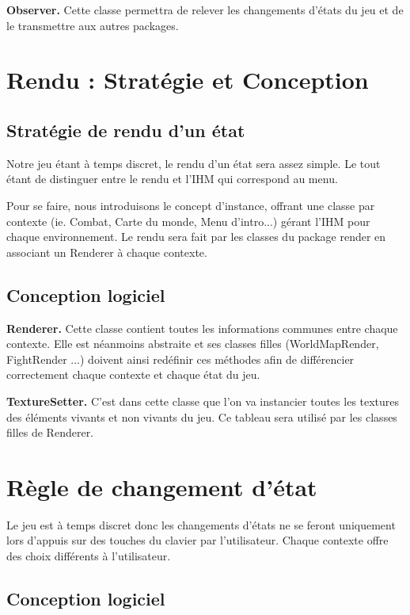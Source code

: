 \documentclass[12pt,a4paper]{report}
\begin{document}
\textbf{Observer.} Cette classe permettra de relever les changements d'\'{e}tats du jeu et de le transmettre aux autres packages.


\chapter{Rendu : Strat\'{e}gie et Conception}
\section{Strat\'{e}gie de rendu d'un \'{e}tat}
Notre jeu \'{e}tant à temps discret, le rendu d'un \'{e}tat sera assez simple. Le tout \'{e}tant de distinguer entre le rendu et l'IHM qui correspond au menu.

Pour se faire, nous introduisons le concept d'instance, offrant une classe par contexte (ie. Combat, Carte du monde, Menu d'intro...) g\'{e}rant l'IHM pour chaque environnement. Le rendu sera fait par les classes du package render en associant un Renderer à chaque contexte.

\section{Conception logiciel}

\textbf{Renderer.} Cette classe contient toutes les informations communes entre chaque contexte. Elle est n\'{e}anmoins abstraite et ses classes filles (WorldMapRender, FightRender ...) doivent ainsi red\'{e}finir ces m\'{e}thodes afin de diff\'{e}rencier correctement chaque contexte et chaque \'{e}tat du jeu.

\textbf{TextureSetter.} C'est dans cette classe que l'on va instancier toutes les textures des \'{e}l\'{e}ments vivants et non vivants du jeu. Ce tableau sera utilis\'{e} par les classes filles de Renderer.


\chapter{R\`{e}gle de changement d'\'{e}tat}

Le jeu est \`{a} temps discret donc les changements d'\'{e}tats ne se feront uniquement lors d'appuis sur des touches du clavier par l'utilisateur. Chaque contexte offre des choix diff\'{e}rents \`{a} l'utilisateur. 

\section{Conception logiciel}
\end{document}
